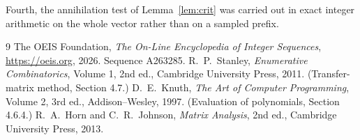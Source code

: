 \documentclass[11pt,a4paper]{article}
\theoremstyle{plain}
\theoremstyle{definition}
\begin{document}
Fourth, the annihilation test of Lemma~\ref{lem:crit} was carried out in exact integer
arithmetic on the whole vector rather than on a sampled prefix.

\begin{thebibliography}{9}
 The OEIS Foundation, \emph{The On-Line Encyclopedia of Integer
Sequences}, \url{https://oeis.org}, 2026. Sequence A263285.
 R.~P.~Stanley, \emph{Enumerative Combinatorics}, Volume 1, 2nd ed.,
Cambridge University Press, 2011. (Transfer-matrix method, Section 4.7.)
 D.~E.~Knuth, \emph{The Art of Computer Programming}, Volume 2, 3rd ed.,
Addison--Wesley, 1997. (Evaluation of polynomials, Section 4.6.4.)
 R.~A.~Horn and C.~R.~Johnson, \emph{Matrix Analysis}, 2nd ed., Cambridge
University Press, 2013.
\end{thebibliography}
\end{document}
